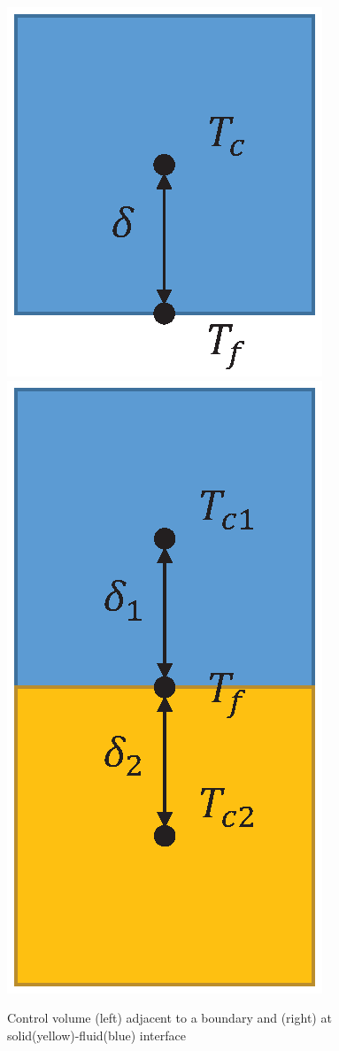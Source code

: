 \begin{figure}[ht]
\centering
\includegraphics[scale=0.5]{openfoam/CV1.eps}
\includegraphics[scale=0.5]{openfoam/CV.eps}
\caption{Control volume (left) adjacent to a boundary and (right) at solid(yellow)-fluid(blue) interface}
\label{fig:CV}
\end{figure}


